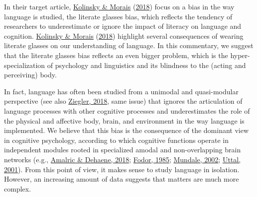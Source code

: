 \documentclass[
  a4paper,12pt,twoside,onecolumn,openright,final,oldfontcommands]{memoir}
\begin{document}
In their target article, \protect\hyperlink{ref-kolinsky_worries_2018}{Kolinsky \& Morais} (\protect\hyperlink{ref-kolinsky_worries_2018}{2018}) focus on a bias in the way language is studied, the literate glasses bias, which reflects the tendency of researchers to underestimate or ignore the impact of literacy on language and cognition. \protect\hyperlink{ref-kolinsky_worries_2018}{Kolinsky \& Morais} (\protect\hyperlink{ref-kolinsky_worries_2018}{2018}) highlight several consequences of wearing literate glasses on our understanding of language. In this commentary, we suggest that the literate glasses bias reflects an even bigger problem, which is the hyper-specialization of psychology and linguistics and its blindness to the (acting and perceiving) body.

In fact, language has often been studied from a unimodal and quasi-modular perspective (see also \protect\hyperlink{ref-ziegler_eyes_2018}{Ziegler, 2018}, same issue) that ignores the articulation of language processes with other cognitive processes and underestimates the role of the physical and affective body, brain, and environment in the way language is implemented. We believe that this bias is the consequence of the dominant view in cognitive psychology, according to which cognitive functions operate in independent modules rooted in specialized amodal and non-overlapping brain networks (e.g., \protect\hyperlink{ref-amalric_cortical_2018}{Amalric \& Dehaene, 2018}; \protect\hyperlink{ref-fodor_precis_1985}{Fodor, 1985}; \protect\hyperlink{ref-mundale_concepts_2002}{Mundale, 2002}; \protect\hyperlink{ref-uttal_new_2001}{Uttal, 2001}). From this point of view, it makes sense to study language in isolation. However, an increasing amount of data suggests that matters are much more complex.
\end{document}
